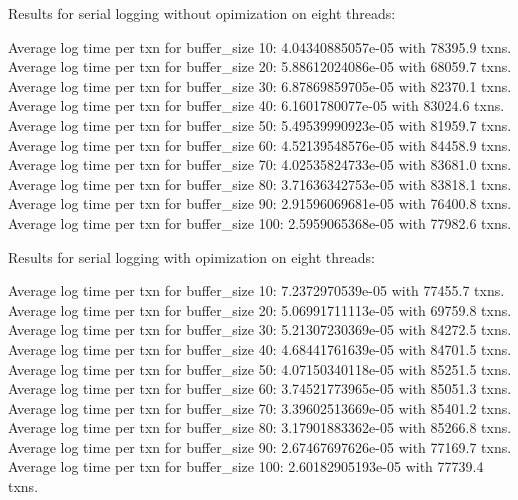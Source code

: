 Results for serial logging without opimization on eight threads:


Average log time per txn for buffer_size 10: 4.04340885057e-05 with 78395.9 txns.
Average log time per txn for buffer_size 20: 5.88612024086e-05 with 68059.7 txns.
Average log time per txn for buffer_size 30: 6.87869859705e-05 with 82370.1 txns.
Average log time per txn for buffer_size 40: 6.1601780077e-05 with 83024.6 txns.
Average log time per txn for buffer_size 50: 5.49539990923e-05 with 81959.7 txns.
Average log time per txn for buffer_size 60: 4.52139548576e-05 with 84458.9 txns.
Average log time per txn for buffer_size 70: 4.02535824733e-05 with 83681.0 txns.
Average log time per txn for buffer_size 80: 3.71636342753e-05 with 83818.1 txns.
Average log time per txn for buffer_size 90: 2.91596069681e-05 with 76400.8 txns.
Average log time per txn for buffer_size 100: 2.5959065368e-05 with 77982.6 txns.

Results for serial logging with opimization on eight threads:


Average log time per txn for buffer_size 10: 7.2372970539e-05 with 77455.7 txns.
Average log time per txn for buffer_size 20: 5.06991711113e-05 with 69759.8 txns.
Average log time per txn for buffer_size 30: 5.21307230369e-05 with 84272.5 txns.
Average log time per txn for buffer_size 40: 4.68441761639e-05 with 84701.5 txns.
Average log time per txn for buffer_size 50: 4.07150340118e-05 with 85251.5 txns.
Average log time per txn for buffer_size 60: 3.74521773965e-05 with 85051.3 txns.
Average log time per txn for buffer_size 70: 3.39602513669e-05 with 85401.2 txns.
Average log time per txn for buffer_size 80: 3.17901883362e-05 with 85266.8 txns.
Average log time per txn for buffer_size 90: 2.67467697626e-05 with 77169.7 txns.
Average log time per txn for buffer_size 100: 2.60182905193e-05 with 77739.4 txns.
